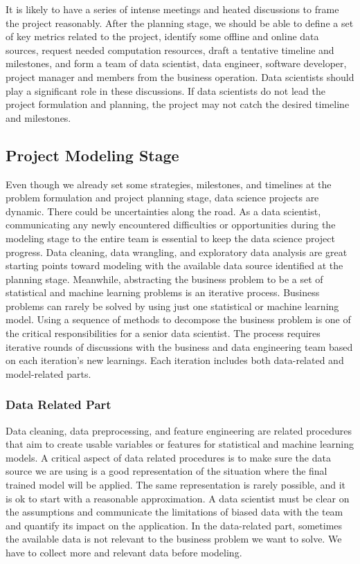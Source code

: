 \documentclass[
  12pt,
]{krantz}
\begin{document}
It is likely to have a series of intense meetings and heated discussions to frame the project reasonably. After the planning stage, we should be able to define a set of key metrics related to the project, identify some offline and online data sources, request needed computation resources, draft a tentative timeline and milestones, and form a team of data scientist, data engineer, software developer, project manager and members from the business operation. Data scientists should play a significant role in these discussions. If data scientists do not lead the project formulation and planning, the project may not catch the desired timeline and milestones.

\hypertarget{project-modeling-stage}{%
\subsection{Project Modeling Stage}\label{project-modeling-stage}}

Even though we already set some strategies, milestones, and timelines at the problem formulation and project planning stage, data science projects are dynamic. There could be uncertainties along the road. As a data scientist, communicating any newly encountered difficulties or opportunities during the modeling stage to the entire team is essential to keep the data science project progress. Data cleaning, data wrangling, and exploratory data analysis are great starting points toward modeling with the available data source identified at the planning stage. Meanwhile, abstracting the business problem to be a set of statistical and machine learning problems is an iterative process. Business problems can rarely be solved by using just one statistical or machine learning model. Using a sequence of methods to decompose the business problem is one of the critical responsibilities for a senior data scientist. The process requires iterative rounds of discussions with the business and data engineering team based on each iteration's new learnings. Each iteration includes both data-related and model-related parts.

\hypertarget{data-related-part}{%
\subsubsection{Data Related Part}\label{data-related-part}}

Data cleaning, data preprocessing, and feature engineering are related procedures that aim to create usable variables or features for statistical and machine learning models. A critical aspect of data related procedures is to make sure the data source we are using is a good representation of the situation where the final trained model will be applied. The same representation is rarely possible, and it is ok to start with a reasonable approximation. A data scientist must be clear on the assumptions and communicate the limitations of biased data with the team and quantify its impact on the application. In the data-related part, sometimes the available data is not relevant to the business problem we want to solve. We have to collect more and relevant data before modeling.
\end{document}

